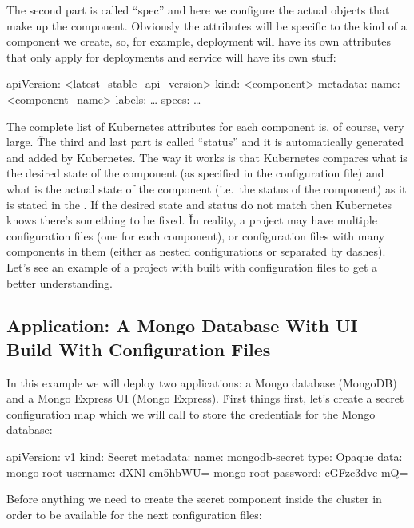 The second part is called ``spec'' and here we configure the actual objects that make up the component. Obviously the
attributes will be specific to the kind of a component we create, so, for example, deployment will have its own
attributes that only apply for deployments and service will have its own stuff:

\begin{block}
apiVersion: <latest_stable_api_version>
kind: <component>
metadata:
   name: <component_name>
   labels: \dots
specs:
    \dots
\end{block}

The complete list of Kubernetes attributes for each component is, of course, very large. \v

The third and last part is called ``status'' and it is automatically generated and added by Kubernetes. The way it
works is that Kubernetes compares what is the desired state of the component (as specified in the configuration file)
and what is the actual state of the component (i.e.\ the status of the component) as it is stated in the .
If the desired state and status do not match then Kubernetes knows there's something to be fixed. \v

In reality, a project may have multiple configuration files (one for each component), or configuration files with
many components in them (either as nested configurations or separated by dashes). Let's see an example of a project
with built with configuration files to get a better understanding.

\subsection*{Application: A Mongo Database With UI Build With Configuration Files}

In this example we will deploy two applications: a Mongo database (MongoDB) and a Mongo Express UI (Mongo Express). \v

First things first, let's create a secret configuration map which we will call  to store the
credentials for the Mongo database:

\begin{block}
apiVersion: v1
kind: Secret
metadata:
    name: mongodb-secret
type: Opaque
data:
    mongo-root-username: dXNl-cm5hbWU=
    mongo-root-password: cGFzc3dvc-mQ=
\end{block}

Before anything we need to create the secret component inside the cluster in order to be available for the next
configuration files:

